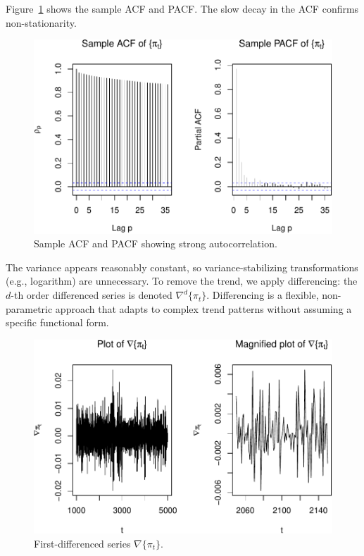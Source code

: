 \documentclass[final,11pt]{article}
\theoremstyle{plain}
\theoremstyle{remark}
\begin{document}
Figure~\ref{fig:f0} shows the sample ACF and PACF. The slow decay in the
ACF confirms non-stationarity.

\begin{figure}
\includegraphics{paper_files/figure-latex/unnamed-chunk-3-1.pdf}
\caption{Sample ACF and PACF showing strong autocorrelation.}
\label{fig:f0}
\end{figure}

The variance appears reasonably constant, so variance-stabilizing
transformations (e.g., logarithm) are unnecessary. To remove the trend,
we apply differencing: the $d$-th order differenced series is denoted
$\nabla^d\{\pi_t\}$. Differencing is a flexible, non-parametric approach
that adapts to complex trend patterns without assuming a specific
functional form.

\begin{figure}
\includegraphics{paper_files/figure-latex/unnamed-chunk-4-1.pdf}
\caption{First-differenced series $\nabla \{\pi_t\}$.}
\label{fig:f1}
\end{figure}
\end{document}
